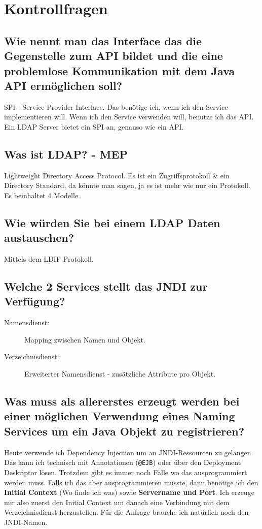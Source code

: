 \section{Kontrollfragen}

\subsection{Wie nennt man das Interface das die Gegenstelle zum API bildet und die eine problemlose Kommunikation mit dem Java API ermöglichen soll?}
SPI - Service Provider Interface. Das benötige ich, wenn ich den Service implementieren will. Wenn ich den Service verwenden will, benutze ich das API. Ein LDAP Server bietet ein SPI an, genauso wie ein API.

\subsection{Was ist LDAP? - MEP}
Lightweight Directory Access Protocol. Es ist ein Zugriffsprotokoll \& ein Directory Standard, da könnte man sagen, ja es ist mehr wie nur ein Protokoll. Es beinhaltet 4 Modelle.

\subsection{Wie würden Sie bei einem LDAP Daten austauschen?} 

Mittels dem LDIF Protokoll.

\subsection{Welche 2 Services stellt das JNDI zur Verfügung?}
\begin{description}
	\item[Namensdienst:] Mapping zwischen Namen und Objekt.
	\item[Verzeichnisdienst:] Erweiterter Namensdienst - zusätzliche Attribute pro Objekt.
\end{description}

\subsection{Was muss als allererstes erzeugt werden bei einer möglichen Verwendung eines Naming Services um ein Java Objekt zu registrieren?}
Heute verwende ich Dependency Injection um an JNDI-Ressourcen zu gelangen. Das kann ich technisch mit Annotationen (\verb|@EJB|) oder über den Deployment Deskriptor lösen. Trotzdem gibt es immer noch Fälle wo das ausprogrammiert werden muss. Falls ich das aber ausprogrammieren müsste, dann benötige ich den \textbf{Initial Context} (Wo finde ich was) sowie \textbf{Servername und Port}. Ich erzeuge mir also zuerst den Initial Context um danach eine Verbindung mit dem Verzeichnisdienst herzustellen. Für die Anfrage brauche ich natürlich noch den JNDI-Namen.

